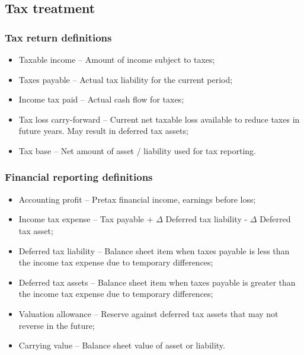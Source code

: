 \documentclass[../notes_compiled.tex]{subfiles}
\begin{document}
\subsection{Tax treatment}
\subsubsection{Tax return definitions}
\begin{itemize}
\item Taxable income -- Amount of income subject to taxes;
\item Taxes payable -- Actual tax liability for the current period;
\item Income tax paid -- Actual cash flow for taxes;
\item Tax loss carry-forward -- Current net taxable loss available to reduce taxes in future years. May result in deferred tax assets;
\item Tax base -- Net amount of asset / liability used for tax reporting.
\end{itemize}
\subsubsection{Financial reporting definitions}
\begin{itemize}
\item Accounting profit -- Pretax financial income, earnings before loss;
\item Income tax expense -- Tax payable + $\Delta$ Deferred tax liability - $\Delta$ Deferred tax asset;
\item Deferred tax liability -- Balance sheet item when taxes payable is less than the income tax expense due to temporary differences;
\item Deferred tax assets -- Balance sheet item when taxes payable is greater than the income tax expense due to temporary differences;
\item Valuation allowance -- Reserve against deferred tax assets that may not reverse in the future;
\item Carrying value -- Balance sheet value of asset or liability.
\end{itemize}
\end{document}
